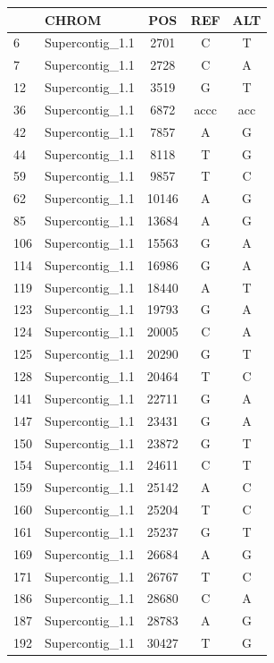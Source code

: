 \documentclass{article}\usepackage[]{graphicx}\usepackage[]{color}
\begin{document}
\begin{table}[ht]
\centering
\begin{tabular}{llccc}
  \hline
 & CHROM & POS & REF & ALT \\ 
  \hline
6 & Supercontig\_1.1 & 2701 & C & T \\ 
  7 & Supercontig\_1.1 & 2728 & C & A \\ 
  12 & Supercontig\_1.1 & 3519 & G & T \\ 
  36 & Supercontig\_1.1 & 6872 & accc & acc \\ 
  42 & Supercontig\_1.1 & 7857 & A & G \\ 
  44 & Supercontig\_1.1 & 8118 & T & G \\ 
  59 & Supercontig\_1.1 & 9857 & T & C \\ 
  62 & Supercontig\_1.1 & 10146 & A & G \\ 
  85 & Supercontig\_1.1 & 13684 & A & G \\ 
  106 & Supercontig\_1.1 & 15563 & G & A \\ 
  114 & Supercontig\_1.1 & 16986 & G & A \\ 
  119 & Supercontig\_1.1 & 18440 & A & T \\ 
  123 & Supercontig\_1.1 & 19793 & G & A \\ 
  124 & Supercontig\_1.1 & 20005 & C & A \\ 
  125 & Supercontig\_1.1 & 20290 & G & T \\ 
  128 & Supercontig\_1.1 & 20464 & T & C \\ 
  141 & Supercontig\_1.1 & 22711 & G & A \\ 
  147 & Supercontig\_1.1 & 23431 & G & A \\ 
  150 & Supercontig\_1.1 & 23872 & G & T \\ 
  154 & Supercontig\_1.1 & 24611 & C & T \\ 
  159 & Supercontig\_1.1 & 25142 & A & C \\ 
  160 & Supercontig\_1.1 & 25204 & T & C \\ 
  161 & Supercontig\_1.1 & 25237 & G & T \\ 
  169 & Supercontig\_1.1 & 26684 & A & G \\ 
  171 & Supercontig\_1.1 & 26767 & T & C \\ 
  186 & Supercontig\_1.1 & 28680 & C & A \\ 
  187 & Supercontig\_1.1 & 28783 & A & G \\ 
  192 & Supercontig\_1.1 & 30427 & T & G \\ 

\end{tabular}
\end{table}
\end{document}
